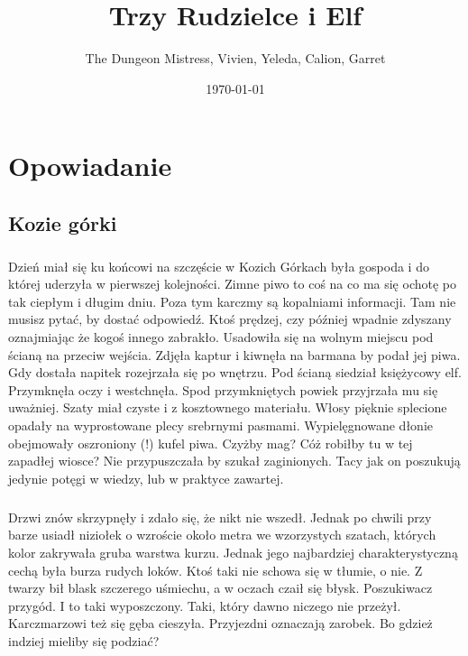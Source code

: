 \documentclass[10pt,twoside,twocolumn]{book}
\title{Trzy Rudzielce i Elf}
\date{\today}
\author{The Dungeon Mistress, Vivien, Yeleda, Calion, Garret}
\begin{document}
\selectfont %
\frontmatter

\maketitle
\begin{multicols}{2}
\tableofcontents
\end{multicols}

\mainmatter



\onecolumn
\large
\chapter{Opowiadanie}
\section*{Kozie górki}
\paragraph{}
Dzień miał się ku końcowi na szczęście w Kozich Górkach była gospoda i do której uderzyła w pierwszej kolejności.
Zimne piwo to coś na co ma się ochotę po tak ciepłym i długim dniu. 
Poza tym karczmy są kopalniami informacji. Tam nie musisz pytać, by dostać odpowiedź. 
Ktoś prędzej, czy później wpadnie zdyszany oznajmiając że kogoś innego zabrakło. 
Usadowiła się na wolnym miejscu pod ścianą na przeciw wejścia. 
Zdjęła kaptur i kiwnęła na barmana by podał jej piwa.
Gdy dostała napitek rozejrzała się po wnętrzu. 
Pod ścianą siedział księżycowy elf. 
Przymknęła oczy i westchnęła. 
Spod przymkniętych powiek przyjrzała mu się  uważniej. 
Szaty miał czyste i z kosztownego materiału. 
Włosy pięknie splecione opadały na wyprostowane plecy srebrnymi pasmami. 
Wypielęgnowane dłonie obejmowały oszroniony (!) kufel piwa. 
Czyżby mag? 
Cóż robiłby tu w tej zapadłej wiosce? 
Nie przypuszczała by szukał zaginionych. 
Tacy jak on poszukują jedynie potęgi w wiedzy, lub w praktyce zawartej.

\paragraph{}
Drzwi znów skrzypnęły i zdało się, że nikt nie wszedł. 
Jednak po chwili przy barze usiadł niziołek o wzroście około metra we wzorzystych szatach, których kolor zakrywała gruba warstwa kurzu. 
Jednak jego najbardziej charakterystyczną cechą była burza rudych loków. 
Ktoś taki nie schowa się w tłumie, o nie. 
Z twarzy bił blask szczerego uśmiechu, a w oczach czaił się błysk. 
Poszukiwacz przygód. 
I to taki wyposzczony. 
Taki, który dawno niczego nie przeżył. 
Karczmarzowi też się gęba cieszyła. 
Przyjezdni oznaczają zarobek. 
Bo gdzież indziej mieliby się podziać?
\end{document}
